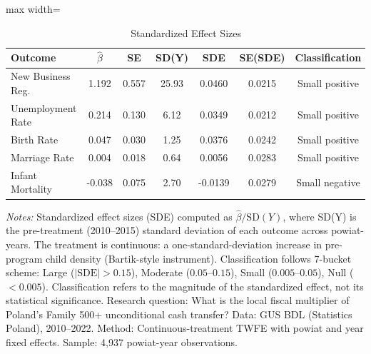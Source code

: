 \begin{table}[htbp]
\centering
\caption{Standardized Effect Sizes}
\label{tab:sde}
\begin{threeparttable}
\begin{adjustbox}{max width=\textwidth}
\begin{tabular}{lcccccc}
\toprule
Outcome & $\hat{\beta}$ & SE & SD(Y) & SDE & SE(SDE) & Classification \\
\midrule
New Business Reg. & 1.192 & 0.557 & 25.93 & 0.0460 & 0.0215 & Small positive \\
Unemployment Rate & 0.214 & 0.130 & 6.12 & 0.0349 & 0.0212 & Small positive \\
Birth Rate & 0.047 & 0.030 & 1.25 & 0.0376 & 0.0242 & Small positive \\
Marriage Rate & 0.004 & 0.018 & 0.64 & 0.0056 & 0.0283 & Small positive \\
Infant Mortality & -0.038 & 0.075 & 2.70 & -0.0139 & 0.0279 & Small negative \\
\bottomrule
\end{tabular}
\end{adjustbox}
\begin{tablenotes}[flushleft]\small
\item \textit{Notes:} Standardized effect sizes (SDE) computed as $\hat{\beta} / \text{SD}(Y)$, where SD(Y) is the pre-treatment (2010--2015) standard deviation of each outcome across powiat-years. The treatment is continuous: a one-standard-deviation increase in pre-program child density (Bartik-style instrument). Classification follows 7-bucket scheme: Large ($|\text{SDE}| > 0.15$), Moderate ($0.05$--$0.15$), Small ($0.005$--$0.05$), Null ($< 0.005$). Classification refers to the magnitude of the standardized effect, not its statistical significance. Research question: What is the local fiscal multiplier of Poland's Family 500+ unconditional cash transfer? Data: GUS BDL (Statistics Poland), 2010--2022. Method: Continuous-treatment TWFE with powiat and year fixed effects. Sample: 4,937 powiat-year observations.
\end{tablenotes}
\end{threeparttable}
\end{table}
